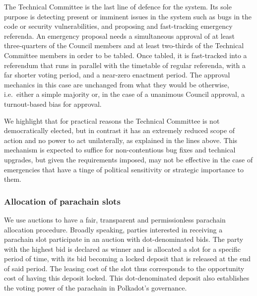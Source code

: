 The Technical Committee is the last line of defence for the system. Its sole purpose is detecting present or imminent issues in the system such as bugs in the code or security vulnerabilities, and proposing and fast-tracking emergency referenda. An emergency proposal needs a simultaneous approval of at least three-quarters of the Council members and at least two-thirds of the Technical Committee members in order to be tabled. Once tabled, it is fast-tracked into a referendum that runs in parallel with the timetable of regular referenda, with a far shorter voting period, and a near-zero enactment period. The approval mechanics in this case are unchanged from what they would be otherwise, i.e.~either a simple majority or, in the case of a unanimous Council approval, a turnout-based bias for approval.

We highlight that for practical reasons the Technical Committee is not democratically elected, but in contrast it has an extremely reduced scope of action and no power to act unilaterally, as explained in the lines above. This mechanism is expected to suffice for non-contentious bug fixes and technical upgrades, but given the requirements imposed, may not be effective in the case of emergencies that have a tinge of political sensitivity or strategic importance to them. 
 
\subsubsection{Allocation of parachain slots}\label{s:pAllocation}

We use auctions to have a fair, transparent and permissionless parachain allocation procedure. 
Broadly speaking, parties interested in receiving a parachain slot participate in an auction with dot-denominated bids. The party with the highest bid is declared as winner and is allocated a slot for a specific period of time, with its bid becoming a locked deposit that is released at the end of said period. The leasing cost of the slot thus corresponds to the opportunity cost of having this deposit locked. This dot-denominated deposit also establishes the voting power of the parachain in Polkadot's governance.

